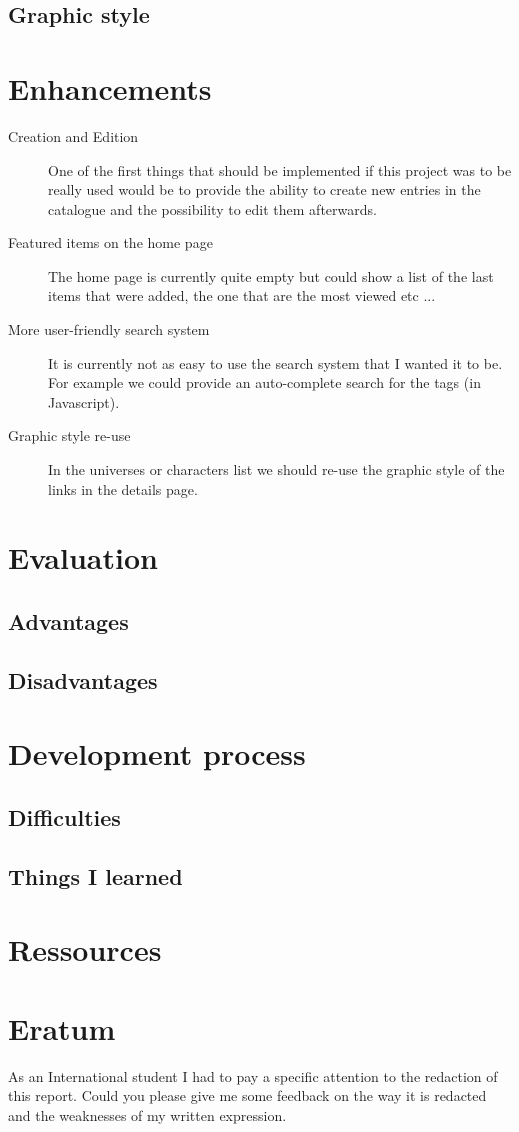 \documentclass[10pt, a4paper]{article}
\begin{document}
	\subsection{Graphic style}
	
	\section{Enhancements}
	\begin{description}
		\item[Creation and Edition] One of the first things that should be implemented if this project was to be really used would be to provide the ability to create new entries in the catalogue and the possibility to edit them afterwards.
		\item[Featured items on the home page] The home page is currently quite empty but could show a list of the last items that were added, the one that are the most viewed etc ...
		\item[More user-friendly search system] It is currently not as easy to use the search system that I wanted it to be. For example we could provide an auto-complete search for the tags (in Javascript).
		\item[Graphic style re-use] In the universes or characters list we should re-use the graphic style of the links in the details page. 
	\end{description}
	
	\section{Evaluation}
	\subsection{Advantages}
	
	\subsection{Disadvantages}

	\section{Development process}
	\subsection{Difficulties}
	
	\subsection{Things I learned}
	
	\section{Ressources}
	
	\section{Eratum}
	As an International student I had to pay a specific attention to the redaction of this report. Could you please give me some feedback on the way it is redacted and the weaknesses of my written expression.
		
\end{document}

